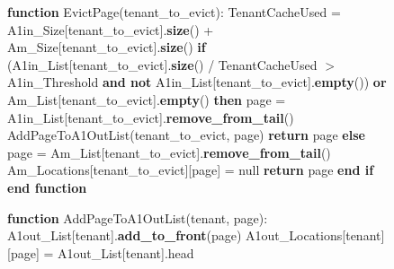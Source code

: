 \begin{figure}[htbp]
\begin{minipage}{\linewidth}
\begin{algorithm}[H]
\begin{algorithmic}
            \STATE
            \STATE \textbf{function} EvictPage(tenant\_to\_evict):
            \STATE \hspace{\algorithmicindent} TenantCacheUsed = A1in\_Size[tenant\_to\_evict].\textbf{size}() + Am\_Size[tenant\_to\_evict].\textbf{size}()
            \STATE \hspace{\algorithmicindent} \textbf{if} (A1in\_List[tenant\_to\_evict].\textbf{size}() / TenantCacheUsed $>$ A1in\_Threshold \textbf{and not} A1in\_List[tenant\_to\_evict].\textbf{empty}()) \textbf{or} Am\_List[tenant\_to\_evict].\textbf{empty}() \textbf{then}
            \STATE \hspace{\algorithmicindent} \hspace{\algorithmicindent} page = A1in\_List[tenant\_to\_evict].\textbf{remove\_from\_tail}()
            \STATE \hspace{\algorithmicindent} \hspace{\algorithmicindent} AddPageToA1OutList(tenant\_to\_evict, page)
            \STATE \hspace{\algorithmicindent} \hspace{\algorithmicindent} \textbf{return} page
            \STATE \hspace{\algorithmicindent} \textbf{else}
            \STATE \hspace{\algorithmicindent} \hspace{\algorithmicindent} page = Am\_List[tenant\_to\_evict].\textbf{remove\_from\_tail}()
            \STATE \hspace{\algorithmicindent} \hspace{\algorithmicindent} Am\_Locations[tenant\_to\_evict][page] = null
            \STATE \hspace{\algorithmicindent} \hspace{\algorithmicindent} \textbf{return} page
            \STATE \hspace{\algorithmicindent} \textbf{end if}
            \STATE \textbf{end function}
        \end{algorithmic}
    \end{algorithm}
    \begin{algorithm}[H]
        \begin{algorithmic}
            \STATE \textbf{function} AddPageToA1OutList(tenant, page):
            \STATE \hspace{\algorithmicindent} \hspace{\algorithmicindent} A1out\_List[tenant].\textbf{add\_to\_front}(page)
            \STATE \hspace{\algorithmicindent} \hspace{\algorithmicindent} A1out\_Locations[tenant][page] = A1out\_List[tenant].head

\end{algorithmic}
\end{algorithm}
\end{minipage}
\end{figure}
